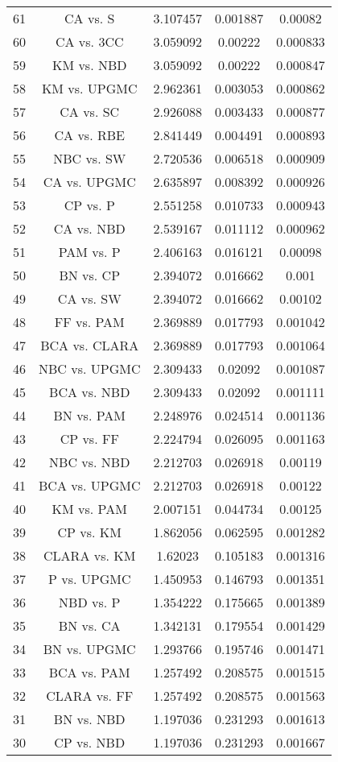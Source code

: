 \documentclass[a4paper,10pt]{article}
\begin{document}
\begin{landscape}
\begin{table}[!htp]
\begin{tabular}{ccccc}
61&CA vs. S&3.107457&0.001887&0.00082\\
60&CA vs. 3CC&3.059092&0.00222&0.000833\\
59&KM vs. NBD&3.059092&0.00222&0.000847\\
58&KM vs. UPGMC&2.962361&0.003053&0.000862\\
57&CA vs. SC&2.926088&0.003433&0.000877\\
56&CA vs. RBE&2.841449&0.004491&0.000893\\
55&NBC vs. SW&2.720536&0.006518&0.000909\\
54&CA vs. UPGMC&2.635897&0.008392&0.000926\\
53&CP vs. P&2.551258&0.010733&0.000943\\
52&CA vs. NBD&2.539167&0.011112&0.000962\\
51&PAM vs. P&2.406163&0.016121&0.00098\\
50&BN vs. CP&2.394072&0.016662&0.001\\
49&CA vs. SW&2.394072&0.016662&0.00102\\
48&FF vs. PAM&2.369889&0.017793&0.001042\\
47&BCA vs. CLARA&2.369889&0.017793&0.001064\\
46&NBC vs. UPGMC&2.309433&0.02092&0.001087\\
45&BCA vs. NBD&2.309433&0.02092&0.001111\\
44&BN vs. PAM&2.248976&0.024514&0.001136\\
43&CP vs. FF&2.224794&0.026095&0.001163\\
42&NBC vs. NBD&2.212703&0.026918&0.00119\\
41&BCA vs. UPGMC&2.212703&0.026918&0.00122\\
40&KM vs. PAM&2.007151&0.044734&0.00125\\
39&CP vs. KM&1.862056&0.062595&0.001282\\
38&CLARA vs. KM&1.62023&0.105183&0.001316\\
37&P vs. UPGMC&1.450953&0.146793&0.001351\\
36&NBD vs. P&1.354222&0.175665&0.001389\\
35&BN vs. CA&1.342131&0.179554&0.001429\\
34&BN vs. UPGMC&1.293766&0.195746&0.001471\\
33&BCA vs. PAM&1.257492&0.208575&0.001515\\
32&CLARA vs. FF&1.257492&0.208575&0.001563\\
31&BN vs. NBD&1.197036&0.231293&0.001613\\
30&CP vs. NBD&1.197036&0.231293&0.001667\\

\end{tabular}
\end{table}
\end{landscape}
\end{document}
